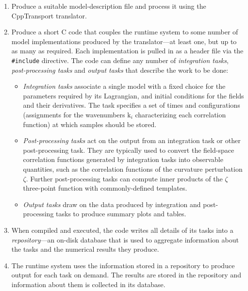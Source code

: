 \documentclass[11pt,a4paper]{article}
\newcommand{\vect}[1]{\bm{\mathrm{{#1}}}}
\newcommand{\packagefont}{\sffamily}
\newcommand{\CppTransport}{{\packagefont CppTransport}}
\newcommand\CC{C\nolinebreak\hspace{-.05em}\raisebox{.4ex}{\relsize{-3}{\textbf{+}}}\nolinebreak\hspace{-.10em}\raisebox{.4ex}{\relsize{-3}{\textbf{+}}}}
\begin{document}
\begin{enumerate}
    \item Produce a suitable model-description file and process it
    using the {\CppTransport} translator.
    
    \item Produce a short {\CC} code
    that couples the runtime system to some number of model implementations produced by
    the translator---at least one, but up to as many as required.
    Each implementation is pulled in as a header file via the \texttt{#include}
    directive.
    The code can define
    any number of \emph{integration tasks},
    \emph{post-processing tasks}
    and \emph{output tasks}
    that describe the work to be done:
    \begin{itemize}
        \item \emph{Integration tasks} associate a single model with a fixed choice
        for the parameters required by its Lagrangian, and initial conditions for
        the fields and their derivatives.
        The task specifies a set of times and
        configurations (assignments for the wavenumbers
        $\vect{k}_i$ characterizing each correlation function)
        at which samples should be stored.
        
        \item \emph{Post-processing tasks} act on the output from an integration
        task or other post-processing task. They are typically used to convert
        the field-space correlation functions generated by integration tasks into
        observable quantities, such as the correlation functions of the
        curvature perturbation $\zeta$.
        Further post-processing tasks can compute inner products of
        the $\zeta$ three-point function with commonly-defined
        templates.
        
        \item \emph{Output tasks} draw on the data produced by integration
        and post-processing tasks to produce summary plots and tables.
    \end{itemize}
    
    \item When compiled and executed, the code writes all details of its tasks into
    a \emph{repository}---an on-disk database that is used to aggregate
    information about the tasks and the numerical results they produce.
    
    \item The runtime system uses the information stored in a repository to
    produce output for each task on demand.
    The results are stored in the repository and information about them
    is collected in its database.
    

\end{enumerate}
\end{document}
